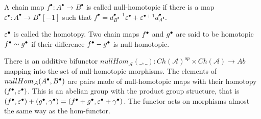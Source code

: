     \begin{definition}
        A chain map $f^{\bullet}:A^{\bullet}\rightarrow B^{\bullet}$ is called null-homotopic if there is a map $\varepsilon^{\bullet}:A^{\bullet}\rightarrow B^{\bullet}[-1]$ such that $f^{\bullet} = d_{B^{\bullet}}^{\bullet - 1}\varepsilon^{\bullet} + \varepsilon^{\bullet + 1}d_{A^{\bullet}}^{\bullet}$.
        \begin{center}
        \end{center}
        $\varepsilon^{\bullet}$ is called the homotopy. Two chain maps $f^{\bullet}$ and $g^{\bullet}$ are said to be homotopic $f^{\bullet}\sim g^{\bullet}$ if their difference $f^{\bullet}-g^{\bullet}$ is null-homotopic.
    \end{definition}

    \begin{prop}
        There is an additive bifunctor $nullHom_{\mathcal{A}}(\_,\_):Ch(\mathcal{A})^{op}\times Ch(\mathcal{A})\rightarrow Ab$ mapping into the set of null-homotopic morphisms. The elements of $nullHom_{\mathcal{A}}(A^{\bullet},B^{\bullet})$ are pairs made of null-homotopic maps with their homotopy $(f^{\bullet},\varepsilon^{\bullet})$. This is an abelian group with the product group structure, that is $(f^{\bullet},\varepsilon^{\bullet}) + (g^{\bullet},\gamma^{\bullet}) = (f^{\bullet}+g^{\bullet},\varepsilon^{\bullet}+\gamma^{\bullet})$. The functor acts on morphisms almost the same way as the hom-functor.
    \end{prop}

